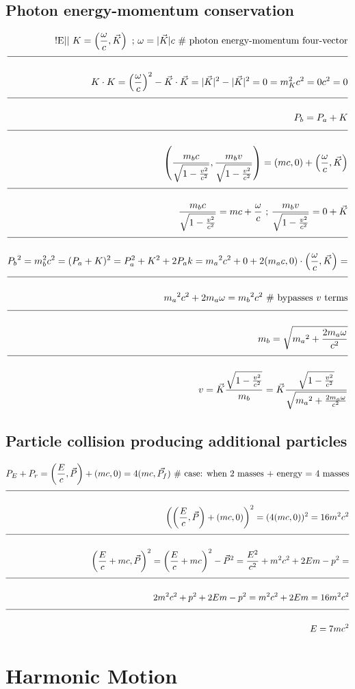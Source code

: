 \documentclass[a4paper]{article}
\newcommand{\eqComment}[1]{\text{  \# #1}}
\newcommand{\eqSep}{\text{ ;  }}
\newcommand{\experimental}{\text{!E||  }}
\newcommand{\n}{\\[1.5ex] \hline \nonumber \\[0ex]}
\begin{document}
\subsection{Photon energy-momentum conservation}
\begin{tcolorbox}
\begin{align}
   \experimental K = \left(\frac{\omega}{c}, \vec{K}\right) \eqSep \omega = |\vec{K}| c \eqComment{photon energy-momentum four-vector}
\n K \cdot K = \left(\frac{\omega}{c}\right)^2 - \vec{K} \cdot \vec{K} = |\vec{K}|^2 - |\vec{K}|^2 = 0 = m_K^2 c^2 = 0 c^2 = 0
\n P_b = P_a + K
\n \left(\frac{m_b c}{\sqrt{1 - \frac{v^2}{c^2}}}, \frac{m_b v}{\sqrt{1 - \frac{v^2}{c^2}}}\right) = (m c, 0) + \left(\frac{\omega}{c}, \vec{K}\right)
\n \frac{m_b c}{\sqrt{1 - \frac{v^2}{c^2}}} = m c + \frac{\omega}{c} \eqSep \frac{m_b v}{\sqrt{1 - \frac{v^2}{c^2}}} = 0 + \vec{K}
\n{P_b}^2 = m_b^2 c^2 = (P_a + K)^2 = P_a^2 + K^2 + 2 P_a k = {m_a}^2 c^2 + 0 + 2 (m_a c, 0) \cdot \left(\frac{\omega}{c}, \vec{K}\right) =
\n {m_a}^2 c^2 + 2 m_a \omega = {m_b}^2 c^2 \eqComment{bypasses $v$ terms}
\n m_b = \sqrt{{m_a}^2 + \frac{2 m_a \omega}{c^2}}
\n v = \vec{K} \frac{\sqrt{1 - \frac{v^2}{c^2}}}{m_b} = \vec{K} \frac{\sqrt{1 - \frac{v^2}{c^2}}}{\sqrt{{m_a}^2 + \frac{2 m_a \omega}{c^2}}}
\end{align}
\end{tcolorbox}

\subsection{Particle collision producing additional particles}
\begin{tcolorbox}
\begin{align}
   P_E + P_{r} = \left(\frac{E}{c}, \vec{P}\right) + (m c, 0) = 4 (m c, \vec{P_f}) \eqComment{case: when 2 masses + energy = 4 masses}
\n \left(\left(\frac{E}{c}, \vec{P}\right) + (m c, 0)\right)^2 =  (4 (m c, 0))^2 = 16 m^2 c^2
\n \left(\frac{E}{c} + m c, \vec{P}\right)^2 = \left(\frac{E}{c} + m c\right)^2 - \vec{P}^2 = \frac{E^2}{c^2} + m^2 c^2 + 2 E m - p^2 =
\n 2 m^2 c^2 + p^2 + 2 E m - p^2 = m^2 c^2 + 2 E m = 16 m^2 c^2
\n E = 7 m c^2
\end{align}
\end{tcolorbox}

\section{Harmonic Motion}
\end{document}
